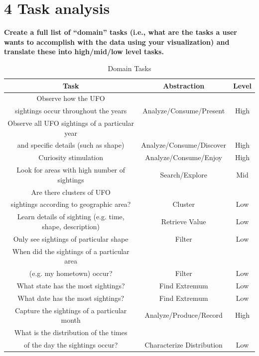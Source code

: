 \documentclass{neu_handout}
\begin{document}
\section*{4 Task analysis}

\textbf{Create a full list of “domain” tasks (i.e., what are the tasks a
user wants to accomplish with the data using your visualization) and translate these into high/mid/low level tasks.}

\begin{table}[h]
\caption{Domain Tasks} %
\centering %
\begin{tabular}{c c c} %
\hline\hline %
 Task & Abstraction & Level \\ [0.5ex]
\hline %

Observe how the UFO \\sightings occur throughout the years &
Analyze/Consume/Present &
High \\[1ex] %

Observe all UFO sightings of a particular year \\ and specific details (such as shape) & 
Analyze/Consume/Discover & High \\[1ex] %

Curiosity stimulation &
Analyze/Consume/Enjoy &
High \\[1ex] %

Look for areas with high number of sightings &
Search/Explore &
Mid \\[1ex] %


Are there clusters of UFO\\ sightings according to geographic area? &
Cluster &
Low  \\[1ex] %

Learn details of sighting (e.g. time, shape, description) &
Retrieve Value &
Low \\[1ex] %

Only see sightings of particular shape &
Filter &
Low \\[1ex] %

When did the sightings of a particular area \\(e.g. my hometown) occur? &
Filter &
Low \\[1ex] %

What state has the most sightings? &
Find Extremum &
Low \\[1ex] %

What date has the most sightings? &
Find Extremum &
Low \\[1ex] %

Capture the sightings of a particular month &
Analyze/Produce/Record &
High \\[1ex] %

What is the distribution of the times\\ of the day the sightings occur? &
Characterize Distribution &
Low \\


\hline 
\end{tabular}
\label{tab:PPer}
\end{table}
\end{document}
